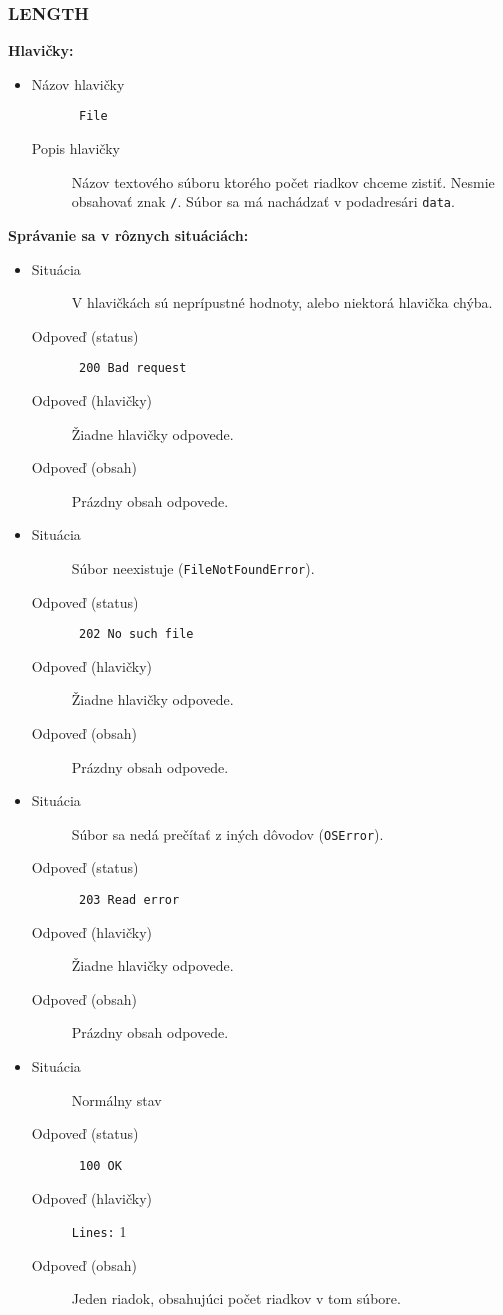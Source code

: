 \subsubsection{ LENGTH }
\noindent\textbf{Hlavičky:}
\begin{itemize}
\item
\begin{description}
\item[Názov hlavičky]\texttt{ File }
\item[Popis hlavičky] Názov textového súboru ktorého počet riadkov chceme zistiť. Nesmie obsahovať znak \texttt{/}. Súbor sa má nachádzať v podadresári \texttt{data}. 
\end{description}
\end{itemize}
\noindent\textbf{Správanie sa v rôznych situáciách:}
\begin{itemize}
\item
\begin{description}
\item[Situácia]
V hlavičkách sú neprípustné hodnoty, alebo niektorá hlavička chýba.
\item[Odpoveď (status)]
\texttt{ 200 Bad request }
\item[Odpoveď (hlavičky)]
Žiadne hlavičky odpovede.
\item[Odpoveď (obsah)]
Prázdny obsah odpovede.
\end{description}
\item
\begin{description}
\item[Situácia]
Súbor neexistuje (\texttt{FileNotFoundError}).
\item[Odpoveď (status)]
\texttt{ 202 No such file }
\item[Odpoveď (hlavičky)]
Žiadne hlavičky odpovede.
\item[Odpoveď (obsah)]
Prázdny obsah odpovede.
\end{description}
\item
\begin{description}
\item[Situácia]
Súbor sa nedá prečítať z iných dôvodov (\texttt{OSError}).
\item[Odpoveď (status)]
\texttt{ 203 Read error }
\item[Odpoveď (hlavičky)]
Žiadne hlavičky odpovede.
\item[Odpoveď (obsah)]
Prázdny obsah odpovede.
\end{description}
\item
\begin{description}
\item[Situácia]
Normálny stav
\item[Odpoveď (status)]
\texttt{ 100 OK }
\item[Odpoveď (hlavičky)]
\texttt{Lines:} 1
\item[Odpoveď (obsah)]
Jeden riadok, obsahujúci počet riadkov v tom súbore.
\end{description}
\end{itemize}
